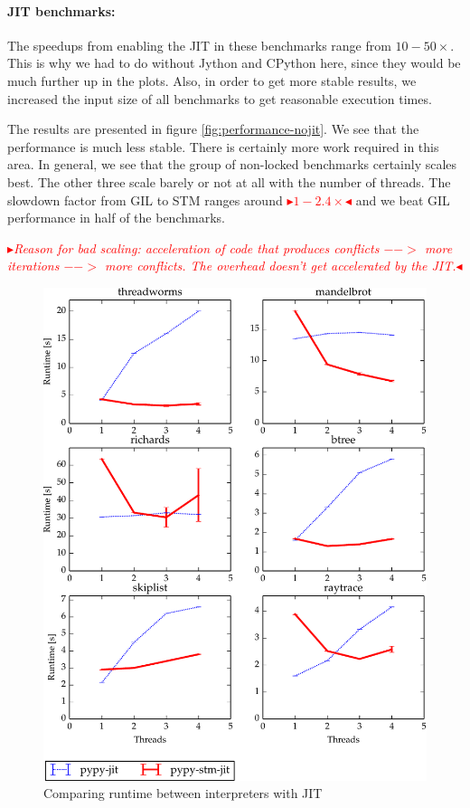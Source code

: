 \documentclass{sigplanconf}
\newcommand{\mynote}[2]{%
  \textcolor{red}{%
    \fbox{\bfseries\sffamily\scriptsize#1}%
    {\small$\blacktriangleright$\textsf{\emph{#2}}$\blacktriangleleft$}%
  }%
}
\newcommand\remi[1]{\mynote{Remi}{#1}}
\begin{document}
\paragraph{JIT benchmarks:} The speedups from enabling the JIT in
these benchmarks range from $10-50\times$. This is why we had to do
without Jython and CPython here, since they would be much further up
in the plots. Also, in order to get more stable results, we increased
the input size of all benchmarks to get reasonable execution times.

The results are presented in figure \ref{fig:performance-nojit}. We
see that the performance is much less stable. There is certainly more
work required in this area. In general, we see that the group of
non-locked benchmarks certainly scales best. The other three scale
barely or not at all with the number of threads. The slowdown factor
from GIL to STM ranges around \remi{$1-2.4\times$} and we beat GIL
performance in half of the benchmarks.

\remi{Reason for bad scaling: acceleration of code that produces
conflicts $-->$ more iterations $-->$ more conflicts. The overhead
doesn't get accelerated by the JIT.}


\begin{figure}[h]
  \centering
  \includegraphics[width=1\columnwidth]{plots/performance.pdf}
  \caption{Comparing runtime between interpreters with JIT\label{fig:performance-jit}}
\end{figure}
\end{document}
